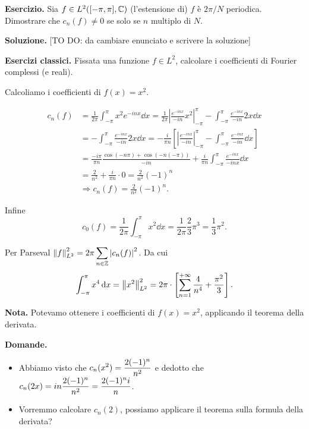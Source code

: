 \textbf{Esercizio.} Sia $f \in L^2([-\pi,\pi], \mathbb C) $ (l'estensione di) $f$ è $2\pi / N$ periodica. Dimostrare che $c_n(f) \neq 0$ se solo se $n$ multiplo di $N$.

\textbf{Soluzione.} [TO DO: da cambiare enunciato e scrivere la soluzione]


\textbf{Esercizi classici.} Fissata una funzione $f \in L^2$, calcolare i coefficienti di Fourier complessi (e reali).

Calcoliamo i coefficienti di $f(x) = x^2$.

\begin{align*}
	c_n(f) & = \frac{1}{2\pi} \int_{-\pi}^\pi x^2 e^{-inx} \dd x = \frac{1}{2\pi} \left| \frac{e^{-inx}}{-in} x^2 \right|_{-\pi}^\pi - \int_{-\pi}^\pi \frac{e^{-inx}}{-in} 2x \dd x \\
	& = - \int_{-\pi}^\pi \frac{e^{-inx}}{-in} 2x \dd x = -\frac{i}{\pi n} \left[ \left| \frac{e^{-inx}}{-in} \right|_{-\pi}^\pi - \int_{-\pi}^\pi \frac{e^{-inx}}{-in} \dd x  \right] \\
	& = \frac{-i \pi}{\pi n} \frac{\cos(-n\pi) + \cos(-n (-\pi))}{-in} + \frac{i}{\pi n} \int_{-\pi}^\pi \frac{e^{-inx}}{-inx} \dd x \\
	& = \frac{2}{n^2} + \frac{i}{\pi n} \cdot 0 = \frac{2}{n^2} (-1)^n \\
	& \Longrightarrow c_n(f) = \frac{2}{n^2} (-1)^n.
\end{align*}

Infine
%
$$
c_0(f) = \frac{1}{2\pi} \int_{-\pi}^\pi x^2 \dd x = \frac{1}{2\pi} \frac{2}{3} \pi^3 = \frac{1}{3} \pi^2.
$$
%

Per Parseval $\displaystyle \left\lVert f \right\rVert_{L^2}^2 = 2\pi \sum_{n \in \mathbb Z} \left| c_n(f) \right|^2$.
Da cui
%
$$
\int_{-\pi}^\pi x^4 \,\mathrm{d} x = \left\lVert x^2 \right\rVert_{L^2}^2 = 2\pi \cdot \left[ \sum_{n=1}^{+\infty} \frac{4}{n^4} + \frac{\pi^2}{3}  \right].
$$
%

\textbf{Nota.} Potevamo ottenere i coefficienti di $f(x) = x^2$, applicando il teorema della derivata.

\textbf{Domande.}
\begin{itemize}

	\item Abbiamo visto che $\displaystyle c_n(x^2) = \frac{2 (-1)^n}{n^2}$ e dedotto che $\displaystyle c_n(2x) = in \frac{2(-1)^n}{n^2} = \frac{2(-1)^n i}{n}$.


	\item Vorremmo calcolare $c_n(2)$, possiamo applicare il teorema sulla formula della derivata?

\end{itemize}

